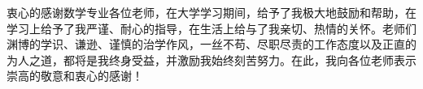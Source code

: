 
\begin{acknowledgment}

衷心的感谢数学专业各位老师，在大学学习期间，给予了我极大地鼓励和帮助，在学习上给予了我严谨、耐心的指导，在生活上给与了我亲切、热情的关怀。老师们渊博的学识、谦逊、谨慎的治学作风，一丝不苟、尽职尽责的工作态度以及正直的为人之道，都将是我终身受益，并激励我始终刻苦努力。在此，我向各位老师表示崇高的敬意和衷心的感谢！

\end{acknowledgment}

